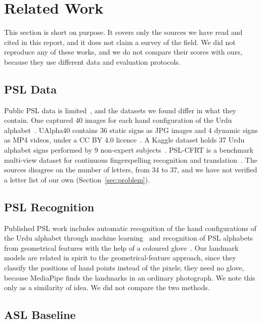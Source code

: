 \section{Related Work}
\label{sec:related-work}

This section is short on purpose. It covers only the sources we have read and cited in this report, and it does not claim a survey of the field. We did not reproduce any of these works, and we do not compare their scores with ours, because they use different data and evaluation protocols.

\subsection{PSL Data}

Public PSL data is limited~\cite{colorglove_psl}, and the datasets we found differ in what they contain. One captured 40 images for each hand configuration of the Urdu alphabet~\cite{imran2021psl}. UAlpha40 contains 36 static signs as JPG images and 4 dynamic signs as MP4 videos, under a CC BY 4.0 licence~\cite{sajid2025ualpha40}. A Kaggle dataset holds 37 Urdu alphabet signs performed by 9 non-expert subjects~\cite{butt_psl_kaggle}. PSL-CFRT is a benchmark multi-view dataset for continuous fingerspelling recognition and translation~\cite{pslcfrt}. The sources disagree on the number of letters, from 34 to 37, and we have not verified a letter list of our own (Section~\ref{sec:problem}).

\subsection{PSL Recognition}

Published PSL work includes automatic recognition of the hand configurations of the Urdu alphabet through machine learning~\cite{imran2021psl} and recognition of PSL alphabets from geometrical features with the help of a coloured glove~\cite{colorglove_psl}. Our landmark models are related in spirit to the geometrical-feature approach, since they classify the positions of hand points instead of the pixels; they need no glove, because MediaPipe finds the landmarks in an ordinary photograph. We note this only as a similarity of idea. We did not compare the two methods.

\subsection{ASL Baseline}

